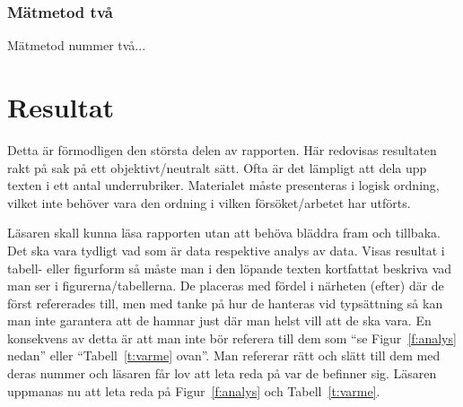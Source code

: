 \documentclass[a4paper]{article}
\begin{document}
\subsubsection{Mätmetod två}
Mätmetod nummer två...

\newpage
\section{Resultat}\label{s:resultat}


Detta är förmodligen den största delen av rapporten. Här redovisas resultaten rakt på sak på ett objektivt/neutralt sätt. Ofta är det lämpligt att dela upp texten i ett antal underrubriker. Materialet måste presenteras i logisk ordning, vilket inte behöver vara den ordning i vilken försöket/arbetet har utförts.

Läsaren skall kunna läsa rapporten utan att behöva bläddra fram och tillbaka. Det ska vara tydligt vad som är data respektive analys av data. Visas resultat i tabell- eller figurform så måste man i den löpande texten kortfattat beskriva vad man ser i figurerna/tabellerna. De placeras med fördel i närheten (efter) där de först refererades till, men med tanke på hur de hanteras vid typsättning så kan man inte garantera att de hamnar just där man helst vill att de ska vara. En konsekvens av detta är att man inte bör referera till dem som ``se Figur~\ref{f:analys} nedan'' eller ``Tabell~\ref{t:varme} ovan''. Man refererar rätt och slätt till dem med deras nummer och läsaren får lov att leta reda på var de befinner sig. Läsaren uppmanas nu att leta reda på Figur~\ref{f:analys} och Tabell~\ref{t:varme}. 
\end{document}
